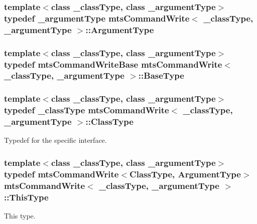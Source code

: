 \subsubsection[{Argument\+Type}]{\setlength{\rightskip}{0pt plus 5cm}template$<$class \+\_\+class\+Type, class \+\_\+argument\+Type$>$ typedef \+\_\+argument\+Type {\bf mts\+Command\+Write}$<$ \+\_\+class\+Type, \+\_\+argument\+Type $>$\+::{\bf Argument\+Type}}\label{classmts_command_write_aa8ff942dbc4caedb34d83a5d6bf47c10}
\hypertarget{classmts_command_write_a40dcfd022c15b4411c0eb5d8fc670dcd}{}
\subsubsection[{Base\+Type}]{\setlength{\rightskip}{0pt plus 5cm}template$<$class \+\_\+class\+Type, class \+\_\+argument\+Type$>$ typedef {\bf mts\+Command\+Write\+Base} {\bf mts\+Command\+Write}$<$ \+\_\+class\+Type, \+\_\+argument\+Type $>$\+::{\bf Base\+Type}}\label{classmts_command_write_a40dcfd022c15b4411c0eb5d8fc670dcd}
\hypertarget{classmts_command_write_aeccc8c434133c4adae34916b42ad493c}{}
\subsubsection[{Class\+Type}]{\setlength{\rightskip}{0pt plus 5cm}template$<$class \+\_\+class\+Type, class \+\_\+argument\+Type$>$ typedef \+\_\+class\+Type {\bf mts\+Command\+Write}$<$ \+\_\+class\+Type, \+\_\+argument\+Type $>$\+::{\bf Class\+Type}}\label{classmts_command_write_aeccc8c434133c4adae34916b42ad493c}
Typedef for the specific interface. \hypertarget{classmts_command_write_a629a4131789c13f5bca121ccc8370ae3}{}
\subsubsection[{This\+Type}]{\setlength{\rightskip}{0pt plus 5cm}template$<$class \+\_\+class\+Type, class \+\_\+argument\+Type$>$ typedef {\bf mts\+Command\+Write}$<${\bf Class\+Type}, {\bf Argument\+Type}$>$ {\bf mts\+Command\+Write}$<$ \+\_\+class\+Type, \+\_\+argument\+Type $>$\+::{\bf This\+Type}}\label{classmts_command_write_a629a4131789c13f5bca121ccc8370ae3}
This type. 

